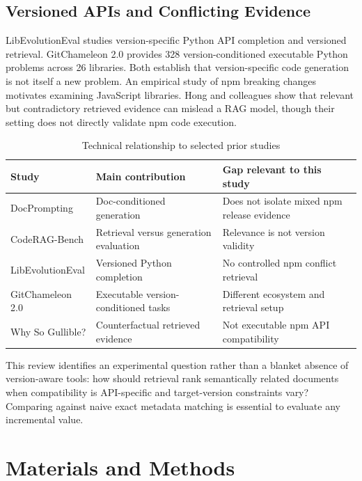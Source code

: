 \documentclass[conference]{IEEEtran}
\begin{document}
\subsection{Versioned APIs and Conflicting Evidence}
LibEvolutionEval \cite{libevolution} studies version-specific Python API completion and versioned retrieval. GitChameleon 2.0 \cite{gitchameleon} provides 328 version-conditioned executable Python problems across 26 libraries. Both establish that version-specific code generation is not itself a new problem. An empirical study of npm breaking changes \cite{npmchanges} motivates examining JavaScript libraries. Hong and colleagues \cite{gullible} show that relevant but contradictory retrieved evidence can mislead a RAG model, though their setting does not directly validate npm code execution.

\begin{table}[t]
\centering
\caption{Technical relationship to selected prior studies}
\label{tab:related}
\setlength{\tabcolsep}{2.5pt}
\begin{tabular}{p{}p{}p{}}
\toprule
Study & Main contribution & Gap relevant to this study\\
\midrule
DocPrompting \cite{docprompting} & Doc-conditioned generation & Does not isolate mixed npm release evidence\\
CodeRAG-Bench \cite{coderag} & Retrieval versus generation evaluation & Relevance is not version validity\\
LibEvolutionEval \cite{libevolution} & Versioned Python completion & No controlled npm conflict retrieval\\
GitChameleon 2.0 \cite{gitchameleon} & Executable version-conditioned tasks & Different ecosystem and retrieval setup\\
Why So Gullible? \cite{gullible} & Counterfactual retrieved evidence & Not executable npm API compatibility\\
\bottomrule
\end{tabular}
\end{table}

This review identifies an experimental question rather than a blanket absence of version-aware tools: how should retrieval rank semantically related documents when compatibility is API-specific and target-version constraints vary? Comparing against naive exact metadata matching is essential to evaluate any incremental value.

\section{Materials and Methods}
\end{document}
